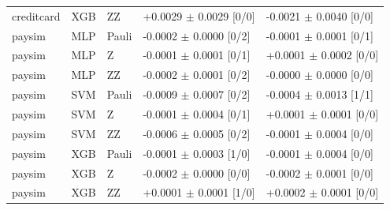 \begin{table}[t]
{\begin{tabular}{lllll}
creditcard & XGB & ZZ & +0.0029 $\pm$ 0.0029 [0/0] & -0.0021 $\pm$ 0.0040 [0/0] \\
paysim & MLP & Pauli & -0.0002 $\pm$ 0.0000 [0/2] & -0.0001 $\pm$ 0.0001 [0/1] \\
paysim & MLP & Z & -0.0001 $\pm$ 0.0001 [0/1] & +0.0001 $\pm$ 0.0002 [0/0] \\
paysim & MLP & ZZ & -0.0002 $\pm$ 0.0001 [0/2] & -0.0000 $\pm$ 0.0000 [0/0] \\
paysim & SVM & Pauli & -0.0009 $\pm$ 0.0007 [0/2] & -0.0004 $\pm$ 0.0013 [1/1] \\
paysim & SVM & Z & -0.0001 $\pm$ 0.0004 [0/1] & +0.0001 $\pm$ 0.0001 [0/0] \\
paysim & SVM & ZZ & -0.0006 $\pm$ 0.0005 [0/2] & -0.0001 $\pm$ 0.0004 [0/0] \\
paysim & XGB & Pauli & -0.0001 $\pm$ 0.0003 [1/0] & -0.0001 $\pm$ 0.0004 [0/0] \\
paysim & XGB & Z & -0.0002 $\pm$ 0.0000 [0/0] & -0.0002 $\pm$ 0.0001 [0/0] \\
paysim & XGB & ZZ & +0.0001 $\pm$ 0.0001 [1/0] & +0.0002 $\pm$ 0.0001 [0/0] \\
\hline
\end{tabular}}
\end{table}
